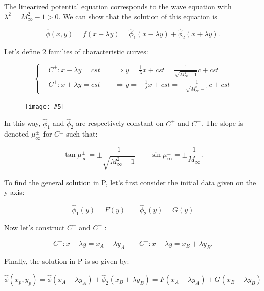 \documentclass[british,french,11pt, a4paper, openany]{article}
\newcommand{\wrapfig}[6]{%
	\begin{figure}%
		\vspace{-5mm}%
		\texttt{[image: \#5]}%
		\captionof{figure}{}%
		\label{#6}%
	\end{figure}%
}
\begin{document}
The linearized potential equation corresponds to the wave equation with $\lambda ^2 = M_\infty ^2 -1 >0$. We can show that the solution of this equation is 

\begin{equation}
\hat{\phi}(x,y)= f(x-\lambda y) = \hat{\phi} _{1}(x-\lambda y) + \hat{\phi} _{2} (x+\lambda y).
\end{equation}		

Let's define 2 families of characteristic curves:

\begin{equation}
\left\{
\begin{aligned}
&C^+ : x-\lambda y = cst \qquad \Rightarrow y = \frac{1}{\lambda} x + cst = \frac{1}{\sqrt{M_\infty ^2 -1}} c + cst\\
&C^+ : x+\lambda y = cst \qquad \Rightarrow y = -\frac{1}{\lambda} x + cst = -\frac{1}{\sqrt{M_\infty ^2 -1}} c + cst
\end{aligned}
\right.
\end{equation}

\wrapfig{8}{r}{5}{0.15}{ch6/8}{fig:6.8}
In this way, $\hat{\phi} _1$ and $\hat{\phi} _2$ are respectively constant on $C^+$ and $C^-$. The slope is denoted $\mu _\infty ^\pm$ for $C^\pm$ such that: 

\begin{equation}
\tan \mu _\infty ^\pm = \pm \frac{1}{\sqrt{M_\infty ^2 -1}} \qquad \sin \mu _\infty ^\pm = \pm \frac{1}{M_\infty}.
\end{equation}

To find the general solution in P, let's first consider the initial data given on the y-axis: 

\begin{equation}
\hat{\phi} _1(y) = F(y)\qquad \hat{\phi}_2 (y) = G(y)
\end{equation}

Now let's construct $C^+$ and $C^-$ : 

\begin{equation}
C^+ : x-\lambda y = x_A - \lambda y_A\qquad C^- : x-\lambda y = x_B + \lambda y_B.
\end{equation}

Finally, the solution in P is so given by:

\begin{equation}
\hat{ \phi} (x_p,y_p) = \hat{\phi} (x_A - \lambda y_A) + \hat{\phi} _2 (x_B + \lambda y_B) = F (x_A - \lambda y_A) + G (x_B + \lambda y_B)
\end{equation}
\end{document}
